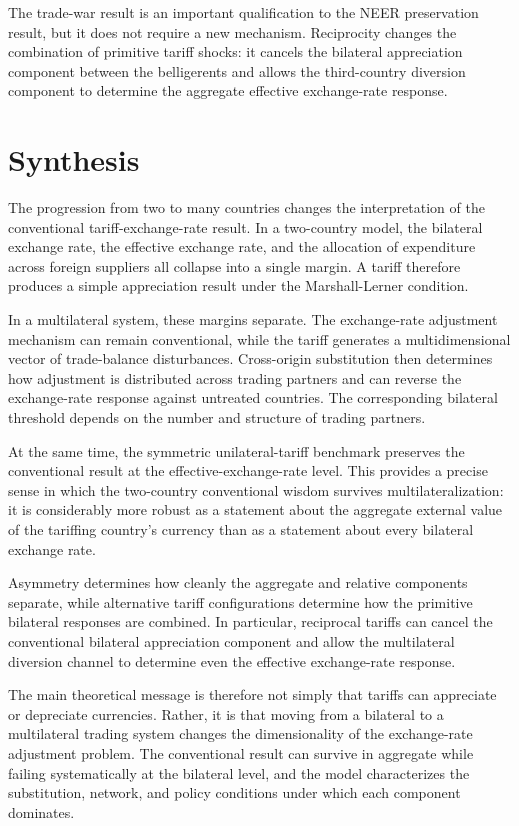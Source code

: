 \documentclass[11pt]{article}
\begin{document}
The trade-war result is an important qualification to the NEER preservation result, but it does not require a new mechanism. Reciprocity changes the combination of primitive tariff shocks: it cancels the bilateral appreciation component between the belligerents and allows the third-country diversion component to determine the aggregate effective exchange-rate response.

\section{Synthesis}

The progression from two to many countries changes the interpretation of the conventional tariff-exchange-rate result. In a two-country model, the bilateral exchange rate, the effective exchange rate, and the allocation of expenditure across foreign suppliers all collapse into a single margin. A tariff therefore produces a simple appreciation result under the Marshall-Lerner condition.

In a multilateral system, these margins separate. The exchange-rate adjustment mechanism can remain conventional, while the tariff generates a multidimensional vector of trade-balance disturbances. Cross-origin substitution then determines how adjustment is distributed across trading partners and can reverse the exchange-rate response against untreated countries. The corresponding bilateral threshold depends on the number and structure of trading partners.

At the same time, the symmetric unilateral-tariff benchmark preserves the conventional result at the effective-exchange-rate level. This provides a precise sense in which the two-country conventional wisdom survives multilateralization: it is considerably more robust as a statement about the aggregate external value of the tariffing country's currency than as a statement about every bilateral exchange rate.

Asymmetry determines how cleanly the aggregate and relative components separate, while alternative tariff configurations determine how the primitive bilateral responses are combined. In particular, reciprocal tariffs can cancel the conventional bilateral appreciation component and allow the multilateral diversion channel to determine even the effective exchange-rate response.

The main theoretical message is therefore not simply that tariffs can appreciate or depreciate currencies. Rather, it is that moving from a bilateral to a multilateral trading system changes the dimensionality of the exchange-rate adjustment problem. The conventional result can survive in aggregate while failing systematically at the bilateral level, and the model characterizes the substitution, network, and policy conditions under which each component dominates.
\end{document}
